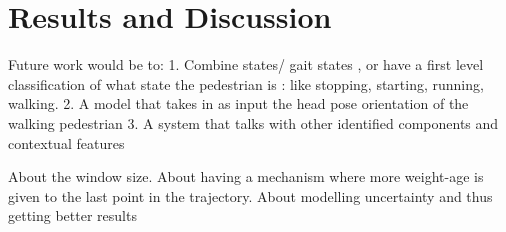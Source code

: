 \chapter{Results and Discussion}


Future work would be to:
1. Combine states/ gait states , or have a first level classification of what state the pedestrian is : like stopping, starting, running, walking. 
2. A model that takes in as input the head pose orientation of the walking pedestrian
3. A system that talks with other identified components and contextual features 

About the window size.
About having a mechanism where more weight-age is given to the last point in the trajectory. 
About modelling uncertainty and thus getting better results
